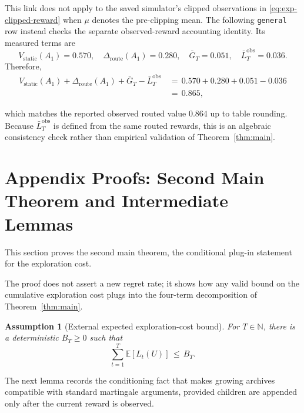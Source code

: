 \documentclass{article} %
\newtheorem{assumption}{Assumption}
\begin{document}
This link does not apply to the saved simulator's clipped observations in
\eqref{eq:exp-clipped-reward} when \(\mu\) denotes the pre-clipping mean.
The following \texttt{general} row instead checks the separate observed-reward
accounting identity.  Its measured terms are
\begin{equation}
V_{\mathrm{static}}(A_1)=0.570,\quad
\Delta_{\mathrm{route}}(A_1)=0.280,\quad
\bar G_T=0.051,\quad
\bar L_T^{\mathrm{obs}}=0.036.
\end{equation}
Therefore,
\begin{equation}
\label{eq:app-numeric-closure}
\begin{aligned}
V_{\mathrm{static}}(A_1)
+
\Delta_{\mathrm{route}}(A_1)
+
\bar G_T
-
\bar L_T^{\mathrm{obs}}
&\,=\,
0.570+0.280+0.051-0.036
\\
&\,=\,
0.865,
\end{aligned}
\end{equation}

which matches the reported observed routed value \(0.864\) up to table
rounding. Because \(\bar L_T^{\mathrm{obs}}\) is defined from the same routed
rewards, this is an algebraic consistency check rather than empirical
validation of Theorem~\ref{thm:main}.

\section{Appendix Proofs: Second Main Theorem and Intermediate Lemmas}

\label{app:proofs2}

This section proves the second main theorem, the conditional plug-in statement for the exploration cost.

The proof does not assert a new regret rate; it shows how any valid bound on the cumulative exploration cost plugs into the four-term decomposition of Theorem~\ref{thm:main}.

\begin{assumption}[External expected exploration-cost bound]
\label{ass:app-external-tax}
For \(T\in\mathbb N\), there is a deterministic \(B_T\geq0\) such that
\begin{equation}
\label{eq:app-external-tax-assumption}
\sum_{t=1}^{T}\mathbb{E}[L_t(U)]
\,\leq\,
B_T.
\end{equation}
\end{assumption}

The next lemma records the conditioning fact that makes growing archives compatible with standard martingale arguments, provided children are appended only after the current reward is observed.
\end{document}
